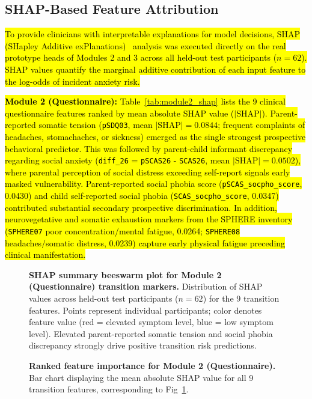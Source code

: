 \documentclass[10pt,letterpaper]{article}
\begin{document}
\subsection*{SHAP-Based Feature Attribution}

\hl{To provide clinicians with interpretable explanations for model decisions, SHAP (SHapley Additive exPlanations)~\cite{ref_shap} analysis was executed directly on the real prototype heads of Modules 2 and 3 across all held-out test participants ($n=62$). SHAP values quantify the marginal additive contribution of each input feature to the log-odds of incident anxiety risk.}

\hl{\textbf{Module 2 (Questionnaire):} Table~\ref{tab:module2_shap} lists the 9 clinical questionnaire features ranked by mean absolute SHAP value ($|\mathrm{SHAP}|$). Parent-reported somatic tension (\texttt{pSDQ03}, mean $|\mathrm{SHAP}| = 0.0844$; frequent complaints of headaches, stomachaches, or sickness) emerged as the single strongest prospective behavioral predictor. This was followed by parent-child informant discrepancy regarding social anxiety (\texttt{diff\_26} = \texttt{pSCAS26} - \texttt{SCAS26}, mean $|\mathrm{SHAP}| = 0.0502$), where parental perception of social distress exceeding self-report signals early masked vulnerability. Parent-reported social phobia score (\texttt{pSCAS\_socpho\_score}, 0.0430) and child self-reported social phobia (\texttt{SCAS\_socpho\_score}, 0.0347) contributed substantial secondary prospective discrimination. In addition, neurovegetative and somatic exhaustion markers from the SPHERE inventory (\texttt{SPHERE07} poor concentration/mental fatigue, 0.0264; \texttt{SPHERE08} headaches/somatic distress, 0.0239) capture early physical fatigue preceding clinical manifestation.}

\begin{figure}[!h]
\caption{\textbf{SHAP summary beeswarm plot for Module 2 (Questionnaire) transition markers.}
Distribution of SHAP values across held-out test participants ($n=62$) for the 9 transition features. Points represent individual participants; color denotes feature value (red = elevated symptom level, blue = low symptom level). Elevated parent-reported somatic tension and social phobia discrepancy strongly drive positive transition risk predictions.}
\label{fig:module2_shap_summary}
\end{figure}

\begin{figure}[!h]
\caption{\textbf{Ranked feature importance for Module 2 (Questionnaire).}
Bar chart displaying the mean absolute SHAP value for all 9 transition features, corresponding to Fig~\ref{fig:module2_shap_summary}.}
\label{fig:module2_bar}
\end{figure}
\end{document}
